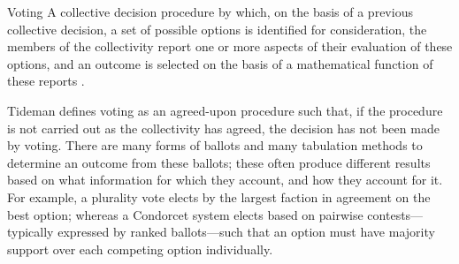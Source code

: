 \clearpage
\begin{definition}{Voting}
    A collective decision procedure by which, on the basis of a previous collective decision, a set of possible options is identified for consideration, the members of the collectivity report one or more aspects of their evaluation of these options, and an outcome is selected on the basis of a mathematical function of these reports \autocite{Tideman2006}.
\end{definition}

Tideman defines voting as an agreed-upon procedure such that, if the procedure is not carried out as the collectivity has agreed, the decision has not been made by voting.  There are many forms of ballots and many tabulation methods to determine an outcome from these ballots; these often produce different results based on what information for which they account, and how they account for it.  For example, a plurality vote elects by the largest faction in agreement on the best option; whereas a Condorcet system elects based on pairwise contests—typically expressed by ranked ballots—such that an option must have majority support over each competing option individually.

